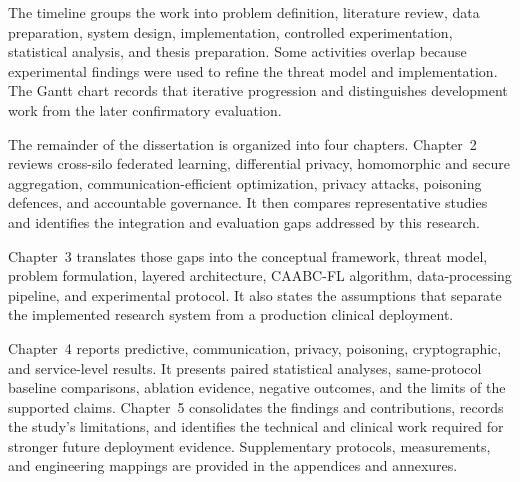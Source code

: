The timeline groups the work into problem definition, literature review, data
preparation, system design, implementation, controlled experimentation,
statistical analysis, and thesis preparation. Some activities overlap because
experimental findings were used to refine the threat model and implementation.
The Gantt chart records that iterative progression and distinguishes development
work from the later confirmatory evaluation.


The remainder of the dissertation is organized into four chapters. Chapter~2
reviews cross-silo federated learning, differential privacy, homomorphic and
secure aggregation, communication-efficient optimization, privacy attacks,
poisoning defences, and accountable governance. It then compares representative
studies and identifies the integration and evaluation gaps addressed by this
research.

Chapter~3 translates those gaps into the conceptual framework, threat model,
problem formulation, layered architecture, CAABC-FL algorithm, data-processing
pipeline, and experimental protocol. It also states the assumptions that separate
the implemented research system from a production clinical deployment.

Chapter~4 reports predictive, communication, privacy, poisoning, cryptographic,
and service-level results. It presents paired statistical analyses, same-protocol
baseline comparisons, ablation evidence, negative outcomes, and the limits of the
supported claims. Chapter~5 consolidates the findings and contributions, records
the study's limitations, and identifies the technical and clinical work required
for stronger future deployment evidence. Supplementary protocols, measurements,
and engineering mappings are provided in the appendices and annexures.
